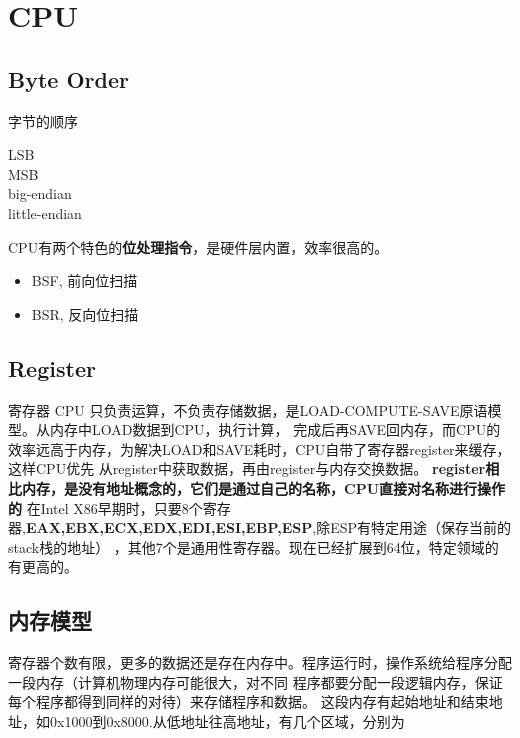 \chapter{CPU}

\section{Byte Order}

字节的顺序

\begin{description}
    \item [LSB] 
    \item [MSB] 
    \item [big-endian] 
    \item [little-endian] 
\end{description}

CPU有两个特色的\textbf{位处理指令}，是硬件层内置，效率很高的。
\begin{itemize}
    \item {BSF, 前向位扫描}
    \item {BSR, 反向位扫描}
\end{itemize}

\section{Register}
寄存器
CPU 只负责运算，不负责存储数据，是LOAD-COMPUTE-SAVE原语模型。从内存中LOAD数据到CPU，执行计算，
完成后再SAVE回内存，而CPU的效率远高于内存，为解决LOAD和SAVE耗时，CPU自带了寄存器register来缓存，这样CPU优先
从register中获取数据，再由register与内存交换数据。
\newline
\textbf{register相比内存，是没有地址概念的，它们是通过自己的名称，CPU直接对名称进行操作的}
\newline
在Intel X86早期时，只要8个寄存器,\textbf{EAX,EBX,ECX,EDX,EDI,ESI,EBP,ESP},除ESP有特定用途（保存当前的stack栈的地址）
，其他7个是通用性寄存器。现在已经扩展到64位，特定领域的有更高的。 

\section{内存模型}
寄存器个数有限，更多的数据还是存在内存中。程序运行时，操作系统给程序分配一段内存（计算机物理内存可能很大，对不同
程序都要分配一段逻辑内存，保证每个程序都得到同样的对待）来存储程序和数据。
\newline
这段内存有起始地址和结束地址，如0x1000到0x8000.从低地址往高地址，有几个区域，分别为
